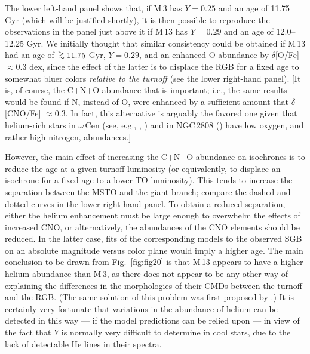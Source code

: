 \documentclass[12pt,preprint]{aastex}
\newcommand\gta{\mathrel{\hbox{\raise 0.6 ex \hbox{$>$}\kern
                   -1.7 ex\lower .5 ex\hbox{$\sim$}}}}
\begin{document}
The lower left-hand panel shows that, if M$\,$3 has $Y = 0.25$ and an age of
11.75 Gyr (which will be justified shortly), it is then possible to reproduce
the observations in the panel just above it if M$\,$13 has $Y = 0.29$ and an
age of 12.0--12.25 Gyr.  We initially thought that similar consistency could be
obtained if M$\,$13 had an age of $\gta 11.75$ Gyr, $Y = 0.29$, and an enhanced
O abundance by $\delta$[O/Fe] $\approx 0.3$ dex, since the effect of the latter
is to displace the RGB for a fixed age to somewhat bluer colors {\it relative to
the turnoff} (see the lower right-hand panel).  [It is, of course, the C$+$N$+$O
abundance that is important; i.e., the same results would be found if N, instead
of O, were enhanced by a sufficient amount that $\delta$[CNO/Fe] $\approx 0.3$.
In fact, this alternative is arguably the favored one given that helium-rich
stars in $\omega\,$Cen (see, e.g., \citealt{jp10}, \citealt{mmp11}) and in
NGC$\,$2808 (\citealt{bcg10}) have low oxygen, and rather high nitrogen,
abundances.]

However, the main effect of increasing the C$+$N$+$O abundance on isochrones
is to reduce the age at a given turnoff luminosity (or equivalently, to displace
an isochrone for a fixed age to a lower TO luminosity).   This tends to increase
the separation between the MSTO and the giant branch; compare the dashed and
dotted curves in the lower right-hand panel.  To obtain a reduced separation,
either the helium enhancement must be large enough to overwhelm the effects of
increased CNO, or alternatively, the abundances of the CNO elements should be
reduced.  In the latter case, fits of the corresponding models to the observed
SGB on an absolute magnitude versus color plane would imply a higher age.  The
main conclusion to be drawn from Fig.~\ref{fig:fig20} is that M$\,$13 appears
to have a higher helium abundance than M$\,$3, as there does not appear to be
any other way of explaining the differences in the morphologies of their CMDs
between the turnoff and the RGB.  (The same solution of this problem was first
proposed by \citealt{jb98}.)  It is certainly very fortunate that variations in
the abundance of helium can be detected in this way --- if the model predictions
can be relied upon --- in view of the fact that $Y$ is normally very difficult
to determine in cool stars, due to the lack of detectable He lines in their
spectra.
\end{document}

